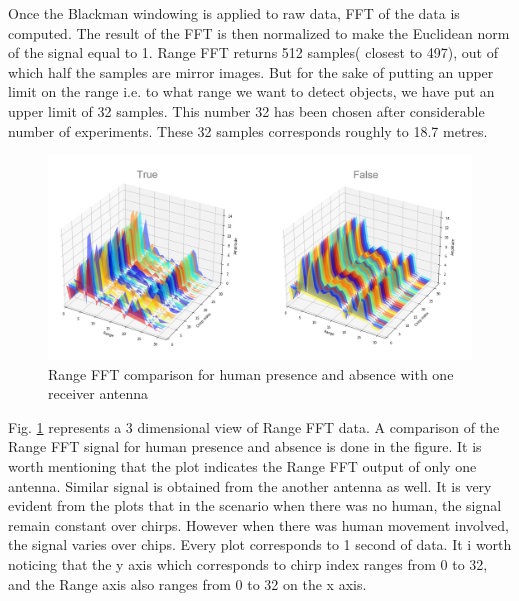 Once the Blackman windowing is applied to raw data, FFT of the data is computed. The result of the FFT is then normalized to make the Euclidean norm of the signal equal to 1. Range FFT returns 512 samples( closest to 497), out of which half the samples are mirror images. But for the sake of putting an upper limit on the range i.e. to what range we want to detect objects, we have put an upper limit of 32 samples. This number 32 has been chosen after considerable number of experiments. These 32 samples corresponds roughly to 18.7 metres. 
\begin{figure}[ht]
  \begin{center}
    \includegraphics[width=1\textwidth]{Master's thesis/images/fft_p_a.PNG} 
    \caption{Range FFT comparison for human presence and absence with one receiver antenna}
    \label{fig:FFT_3d1a}
  \end{center}
\end{figure} 
Fig. \ref{fig:FFT_3d1a} represents a 3 dimensional view of Range FFT data. A comparison of the Range FFT signal for human presence and absence is done in the figure. It is worth mentioning that the plot indicates the Range FFT output of only one antenna. Similar signal is obtained from the another antenna as well. 
It is very evident from the plots that in the scenario when there was no human, the signal remain constant over chirps. However when there was human movement involved, the signal varies over chips. Every plot corresponds to 1 second of data. It i worth noticing that the y axis which corresponds to chirp index ranges from 0 to 32, and the Range axis also ranges from 0 to 32 on the x axis.

